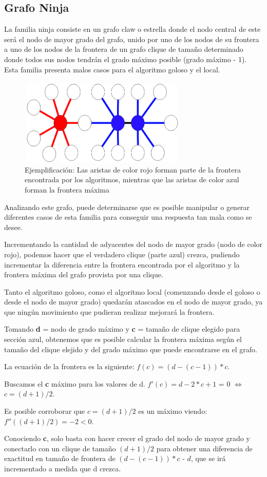 \subsection{Grafo Ninja}
La familia ninja consiste en un grafo claw o estrella donde el nodo central de este será el nodo de mayor grado del grafo, unido por uno de los nodos de su frontera a uno de los nodos de la frontera de un grafo clique de tamaño determinado donde todos sus nodos tendrán el grado máximo posible (grado máximo - 1). Esta familia presenta malos casos para el algoritmo goloso y el local.

\begin{figure}[H]
\centering
\includegraphics[width=80mm]{ejemploErrorGoloso.png}
\caption{Ejemplificación: Las aristas de color rojo forman parte de la frontera encontrada por los algoritmos, mientras que las aristas de color azul forman la frontera máxima}
\label{overflow}
\end{figure}

Analizando este grafo, puede determinarse que es posible manipular o generar diferentes casos de esta familia para conseguir una respuesta tan mala como se desee.

Incrementando la cantidad de adyacentes del nodo de mayor grado (nodo de color rojo), podemos hacer que el verdadero clique (parte azul) crezca, pudiendo incrementar la diferencia entre la frontera encontrada por el algoritmo y la frontera máxima del grafo provista por una clique.

Tanto el algoritmo goloso, como el algoritmo local (comenzando desde el goloso o desde el nodo de mayor grado) quedarán atascados en el nodo de mayor grado, ya que ningún movimiento que pudieran realizar mejorará la frontera.

Tomando \textbf{d} = nodo de grado máximo y \textbf{c} = tamaño de clique elegido para sección azul, obtenemos que es posible calcular la frontera máxima según el tamaño del clique elejido y del grado máximo que puede encontrarse en el grafo.

La ecuación de la frontera es la siguiente: $f(c) = (d - (c - 1)) * c$.

Buscamos el \textbf{c} máximo para los valores de d. $f'(c) = d - 2 * c + 1$ = 0 $\Leftrightarrow$ $c = (d + 1)/2$.

Es posible corroborar que $c = (d + 1)/2$ es un máximo viendo: $f''((d + 1)/2) = -2 < 0$.

Conociendo \textbf{c}, solo basta con hacer crecer el grado del nodo de mayor grado y conectarlo con un clique de tamaño $(d + 1)/2$ para obtener una diferencia de exactitud en tamaño de frontera de $(d - (c - 1)) * c$ - $d$, que se irá incrementado a medida que d crezca.